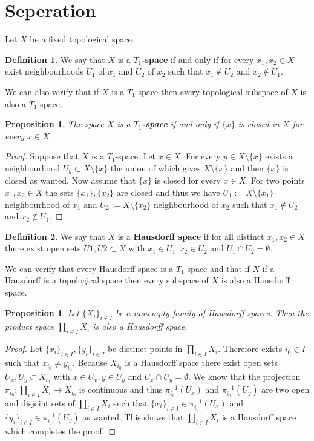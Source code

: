 \documentclass[11pt,a4paper]{article}
\theoremstyle{definition}
\newtheorem{definition}{Definition}[section]
\theoremstyle{plain}
\newtheorem{proposition}[theorem]{Proposition}
\begin{document}
	\section{Seperation}
	Let $X$ be a fixed topological space.
	\begin{definition}
		We say that $X$ is a $T_1$\textbf{-space} if and only if for every
		$x_1, x_2 \in X$ exist neighbourhoods $U_1$ of $x_1$ and $U_2$ of
		$x_2$ such that $x_1 \notin U_2$ and $x_2 \notin U_1$.
	\end{definition}
	We can also verify that if $X$ is a $T_1$-space then every topological
	subspace of $X$ is also a $T_1$-space.
	\begin{proposition}
		The space $X$ is a $T_1$\textbf{-space} if and only if $\{x\}$ is 
		closed in $X$ for every $x \in X$.
	\end{proposition}
	\begin{proof}
		Suppose that $X$ is a $T_1$-space. Let $x \in X$. For every 
		$y \in X \setminus \{x\}$ exists a neighbourhood 
		$U_y \subset X \setminus \{x\}$ the union of which gives 
		$X \setminus \{x\}$ and then $\{x\}$ is closed as wanted. Now
		assume that $\{x\}$ is closed for every $x \in X$. For two points
		$x_1,x_2 \in X$ the sets $\{x_1\},\{x_2\}$ are closed and thus
		we have $U_1 := X \setminus \{x_1\}$ neighbourhood of $x_1$ and
		$U_2 := X \setminus \{x_2\}$ neighbourhood of $x_2$ such that
		$x_1 \notin U_2$ and $x_2 \notin U_1$.
	\end{proof}
	\begin{definition}
		We say that $X$ is a \textbf{Hausdorff space} if for all distinct 
		$x_1, x_2 \in X$ there exist open sets $U1, U2 \subset X$ with 
		$x_1 \in U_1, x_2 \in U_2$ and $U_1 \cap U_2 = \emptyset$.
	\end{definition}
	We can verify that every Hausdorff space is a $T_1$-space and that if
	$X$ if a Hausdorff is a topological space then every subspace of $X$
	is also a Hausdorff space.
	\begin{proposition}
		Let $\{X_i\}_{i \in I}$ be a nonempty family of Hausdorff spaces. 
		Then the product space $\prod_{i \in I}{X_i}$ is also a Hausdorff 
		space.
	\end{proposition}
	\begin{proof}
		Let $\{x_i\}_{i \in I}, \{y_i\}_{i \in I}$ be distinct points
		in $\prod_{i \in I}{X_i}$. Therefore exists $i_0 \in I$ such that
		$x_{i_0} \neq y_{i_0}$. Because $X_{i_0}$ is a Hausdorff space 
		there exist open sets $U_x, U_y \subset X_{i_0}$ with 
		$x \in U_x, y \in U_y$ and $U_x \cap U_y = \emptyset$. We know that
		the projection $\pi_{i_0} \colon \prod_{i \in I}{X_i} \to X_{i_0}$
		is continuous and thus $\pi_{i_0}^{-1}(U_x)$ and $\pi_{i_0}^{-1}(U_y)$
		are two open and disjoint sets of $\prod_{i \in I}{X_i}$ such
		that $\{x_i\}_{i \in I} \in \pi_{i_0}^{-1}(U_x)$ and 
		$\{y_i\}_{i \in I} \in \pi_{i_0}^{-1}(U_y)$ as wanted. This shows
		that $\prod_{i \in I}{X_i}$ is a Hausdorff space which completes
		the proof.
	\end{proof}
\end{document}
